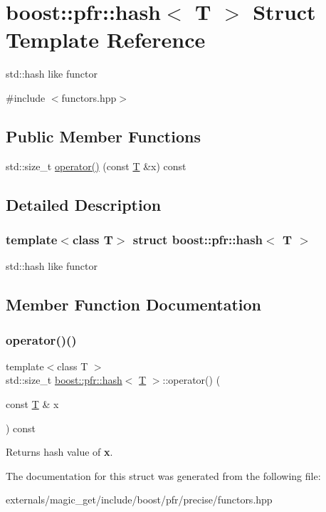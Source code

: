 \hypertarget{structboost_1_1pfr_1_1hash}{}\section{boost\+:\+:pfr\+:\+:hash$<$ T $>$ Struct Template Reference}
\label{structboost_1_1pfr_1_1hash}


std\+::hash like functor  




{\ttfamily \#include $<$functors.\+hpp$>$}

\subsection*{Public Member Functions}
\begin{DoxyCompactItemize}
\item 
std\+::size\+\_\+t \mbox{\hyperlink{structboost_1_1pfr_1_1hash_ae39ac0c72041c3b31c7a87af7b7e8c33}{operator()}} (const \mbox{\hyperlink{struct_t}{T}} \&x) const
\end{DoxyCompactItemize}


\subsection{Detailed Description}
\subsubsection*{template$<$class T$>$\newline
struct boost\+::pfr\+::hash$<$ T $>$}

std\+::hash like functor 

\subsection{Member Function Documentation}
\mbox{\label{structboost_1_1pfr_1_1hash_ae39ac0c72041c3b31c7a87af7b7e8c33}} 
\subsubsection{\texorpdfstring{operator()()}{operator()()}}
{\footnotesize\ttfamily template$<$class T $>$ \\
std\+::size\+\_\+t \mbox{\hyperlink{structboost_1_1pfr_1_1hash}{boost\+::pfr\+::hash}}$<$ \mbox{\hyperlink{struct_t}{T}} $>$\+::operator() (\begin{DoxyParamCaption}\item[{const \mbox{\hyperlink{struct_t}{T}} \&}]{x }\end{DoxyParamCaption}) const\hspace{0.3cm}{\ttfamily [inline]}}

\begin{DoxyReturn}{Returns}
hash value of {\bfseries x}.
\end{DoxyReturn}


The documentation for this struct was generated from the following file\+:\begin{DoxyCompactItemize}
\item 
externals/magic\+\_\+get/include/boost/pfr/precise/functors.\+hpp\end{DoxyCompactItemize}
